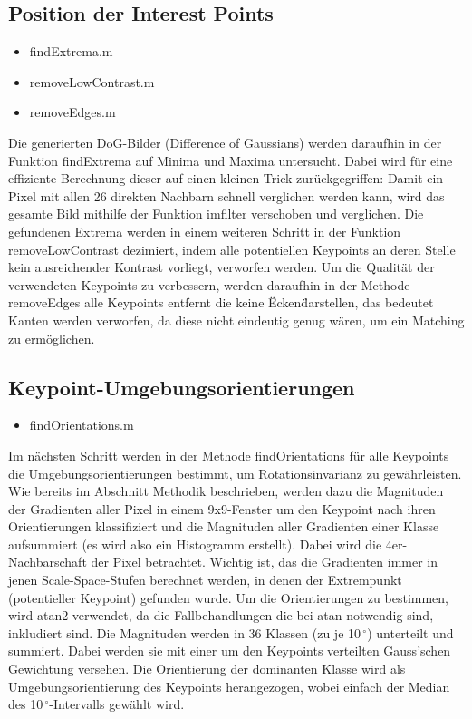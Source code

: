 \documentclass[deutsch]{scrartcl}
\begin{document}
\subsection{Position der Interest Points}
\begin{itemize}
	\item findExtrema.m 
	\item removeLowContrast.m
	\item removeEdges.m
\end{itemize}
Die generierten DoG-Bilder (Difference of
Gaussians) werden daraufhin in der Funktion findExtrema auf Minima und
Maxima untersucht. Dabei wird für eine effiziente Berechnung dieser auf
einen kleinen Trick zurückgegriffen: Damit ein Pixel mit allen 26 direkten
Nachbarn schnell verglichen werden kann, wird das gesamte Bild mithilfe der
Funktion imfilter verschoben und verglichen. Die gefundenen Extrema werden
in einem weiteren Schritt in der Funktion removeLowContrast dezimiert, indem
alle potentiellen Keypoints an deren Stelle kein ausreichender Kontrast
vorliegt, verworfen werden. Um die Qualität der verwendeten Keypoints zu
verbessern, werden daraufhin in der Methode removeEdges alle Keypoints
entfernt die keine \"Ecken\" darstellen, das bedeutet Kanten werden
verworfen, da diese nicht eindeutig genug wären, um ein Matching zu
ermöglichen.

\subsection{Keypoint-Umgebungsorientierungen}
\begin{itemize}
	\item findOrientations.m 
\end{itemize}
Im nächsten Schritt werden in der Methode findOrientations für alle Keypoints die Umgebungsorientierungen bestimmt, um Rotationsinvarianz zu gewährleisten. Wie bereits im Abschnitt Methodik beschrieben, werden dazu die Magnituden der Gradienten aller Pixel in einem 9x9-Fenster um den Keypoint nach ihren Orientierungen klassifiziert und die Magnituden aller Gradienten einer Klasse aufsummiert (es wird also ein Histogramm erstellt). Dabei wird die 4er-Nachbarschaft der Pixel betrachtet. Wichtig ist, das die Gradienten immer in jenen Scale-Space-Stufen berechnet werden, in denen der Extrempunkt (potentieller Keypoint) gefunden wurde. Um die Orientierungen zu bestimmen, wird atan2 verwendet, da die Fallbehandlungen die bei atan notwendig sind, inkludiert sind. Die Magnituden werden in 36 Klassen (zu je 10$\,^{\circ}$) unterteilt und summiert. Dabei werden sie mit einer um den Keypoints verteilten Gauss'schen Gewichtung versehen. Die Orientierung der dominanten Klasse wird als Umgebungsorientierung des Keypoints herangezogen, wobei einfach der Median des 10$\,^{\circ}$-Intervalls gewählt wird.\cite{lowe04} 
\end{document}
